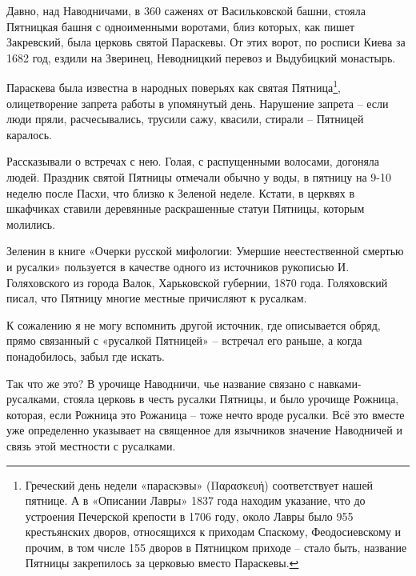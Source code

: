 Давно, над Наводничами, в 360 саженях от Васильковской башни, стояла Пятницкая башня с одноименными воротами, близ которых, как пишет Закревский, была церковь святой Параскевы. От этих ворот, по росписи Киева за 1682 год, ездили на Зверинец, Неводницкий перевоз и Выдубицкий монастырь.

Параскева была известна в народных поверьях как святая Пятница\footnote{Греческий день недели «параскэвы» (Παρασκευή) соответствует нашей пятнице. А в «Описании Лавры» 1837 года находим указание, что до устроения Печерской крепости в 1706 году, около Лавры было 955 крестьянских дворов, относящихся к приходам Спаскому, Феодосиевскому и прочим, в том числе 155 дворов в Пятницком приходе – стало быть, название Пятницы закрепилось за церковью вместо Параскевы.}, олицетворение запрета работы в упомянутый день. Нарушение запрета – если люди пряли, расчесывались, трусили сажу, квасили, стирали – Пятницей каралось. 

Рассказывали о встречах с нею. Голая, с распущенными волосами, догоняла людей. Праздник святой Пятницы отмечали обычно у воды, в пятницу на 9-10 неделю после Пасхи, что близко к Зеленой неделе. Кстати, в церквях в шкафчиках ставили деревянные раскрашенные статуи Пятницы, которым молились.

Зеленин в книге «Очерки русской мифологии: Умершие неестественной смертью и русалки»\cite{zeleninrusalki} пользуется в качестве одного из источников рукописью И. Голяховского из города Валок, Харьковской губернии, 1870 года. Голяховский писал, что Пятницу многие местные причисляют к русалкам. 

К сожалению я не могу вспомнить другой источник, где описывается обряд, прямо связанный с «русалкой Пятницей» – встречал его раньше, а когда понадобилось, забыл где искать.

Так что же это? В урочище Наводничи, чье название связано с навками-русалками, стояла церковь в честь русалки Пятницы, и было урочище Рожница, которая, если Рожница это Рожаница – тоже нечто вроде русалки. Всё это вместе уже определенно указывает на священное для язычников значение Наводничей и связь этой местности с русалками.




